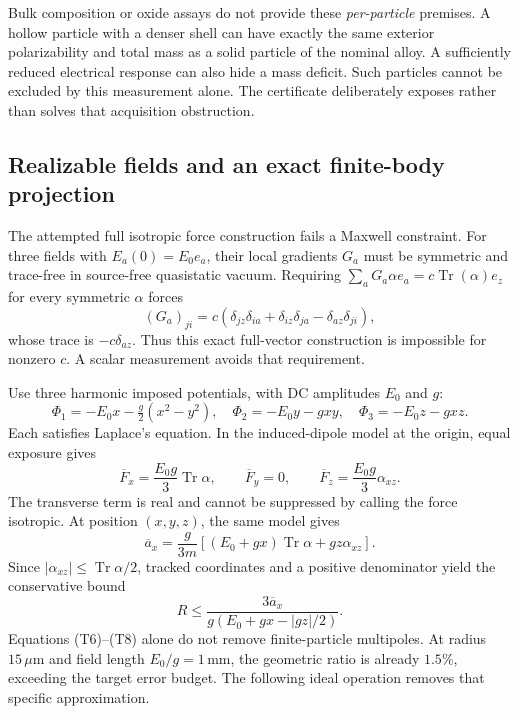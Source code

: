 \documentclass[11pt]{article}
\newcommand{\Tr}{\operatorname{Tr}}
\begin{document}
Bulk composition or oxide assays do not provide these \emph{per-particle} premises. A hollow particle with a denser shell can have exactly the same exterior polarizability and total mass as a solid particle of the nominal alloy. A sufficiently reduced electrical response can also hide a mass deficit. Such particles cannot be excluded by this measurement alone. The certificate deliberately exposes rather than solves that acquisition obstruction.

\subsection{Realizable fields and an exact finite-body projection}

The attempted full isotropic force construction fails a Maxwell constraint. For three fields with $E_a(0)=E_0e_a$, their local gradients $G_a$ must be symmetric and trace-free in source-free quasistatic vacuum. Requiring $\sum_aG_a\alpha e_a=c\Tr(\alpha)e_z$ for every symmetric $\alpha$ forces
\[
 (G_a)_{ji}=c(\delta_{jz}\delta_{ia}+\delta_{iz}\delta_{ja}
                         -\delta_{az}\delta_{ji}),
\]
whose trace is $-c\delta_{az}$. Thus this exact full-vector construction is impossible for nonzero $c$. A scalar measurement avoids that requirement.

Use three harmonic imposed potentials, with DC amplitudes $E_0$ and $g$:
\[
 \Phi_1=-E_0x-\tfrac g2(x^2-y^2),\quad
 \Phi_2=-E_0y-gxy,\quad
 \Phi_3=-E_0z-gxz.
 \tag{T5}
\]
Each satisfies Laplace's equation. In the induced-dipole model at the origin, equal exposure gives
\[
 \overline F_x=\frac{E_0g}{3}\Tr\alpha,\qquad
 \overline F_y=0,\qquad
 \overline F_z=\frac{E_0g}{3}\alpha_{xz}.
 \tag{T6}
\]
The transverse term is real and cannot be suppressed by calling the force isotropic. At position $(x,y,z)$, the same model gives
\[
 \overline a_x=\frac g{3m}
       [(E_0+gx)\Tr\alpha+gz\alpha_{xz}].
 \tag{T7}
\]
Since $|\alpha_{xz}|\le\Tr\alpha/2$, tracked coordinates and a positive denominator yield the conservative bound
\[
 R\le\frac{3\overline a_x}
 {g(E_0+gx-|gz|/2)}.
 \tag{T8}
\]
Equations (T6)--(T8) alone do not remove finite-particle multipoles. At radius $15\,\mu\mathrm m$ and field length $E_0/g=1\,\mathrm{mm}$, the geometric ratio is already $1.5\%$, exceeding the target error budget. The following ideal operation removes that specific approximation.
\end{document}
